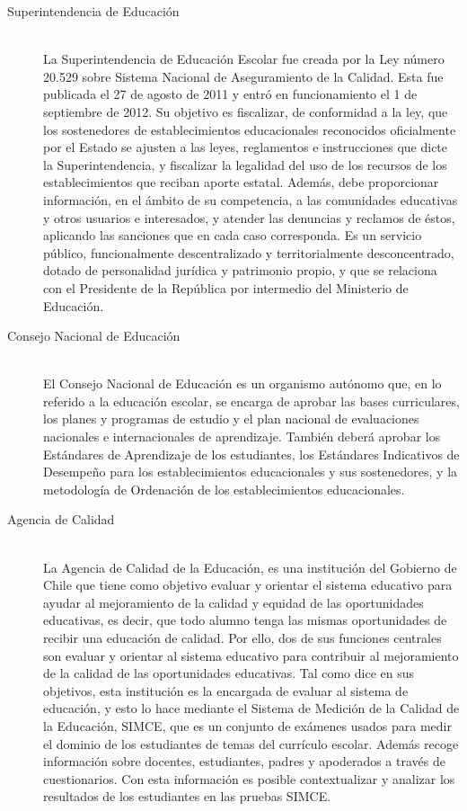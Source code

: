 \begin{description}
\item[Superintendencia de Educación] \hfill \\
La Superintendencia de Educación Escolar fue creada por la Ley número 20.529 sobre Sistema Nacional de Aseguramiento de la Calidad. Esta fue publicada el 27 de agosto de 2011 y entró en funcionamiento el 1 de septiembre de 2012. 
Su objetivo es fiscalizar, de conformidad a la ley, que los sostenedores de establecimientos educacionales reconocidos oficialmente por el Estado se ajusten a las leyes, reglamentos e instrucciones que dicte la Superintendencia, y fiscalizar la legalidad del uso de los recursos de los establecimientos que reciban aporte estatal. Además, debe proporcionar información, en el ámbito de su competencia, a las comunidades educativas y otros usuarios e interesados, y atender las denuncias y reclamos de éstos, aplicando las sanciones que en cada caso corresponda.
Es un servicio público, funcionalmente descentralizado y territorialmente desconcentrado, dotado de personalidad jurídica y patrimonio propio, y que se relaciona con el Presidente de la República por intermedio del Ministerio de Educación. \cite{superint}
\item[Consejo Nacional de Educación] \hfill \\
El Consejo Nacional de Educación es un organismo autónomo que, en lo referido a la educación escolar, se encarga de aprobar las bases curriculares, los planes y programas de estudio y el plan nacional de evaluaciones nacionales e internacionales de aprendizaje. También deberá aprobar los Estándares de Aprendizaje de los estudiantes, los Estándares Indicativos de Desempeño para los establecimientos educacionales y sus sostenedores, y la metodología de Ordenación de los establecimientos educacionales.
\item[Agencia de Calidad] \hfill \\
La Agencia de Calidad de la Educación, es una institución del Gobierno de Chile que tiene como objetivo  evaluar y orientar el sistema educativo para ayudar al mejoramiento de la calidad y equidad de las oportunidades educativas, es decir, que todo alumno tenga las mismas oportunidades de recibir una educación de calidad. Por ello, dos de sus funciones centrales son evaluar y orientar al sistema educativo para contribuir al mejoramiento de la calidad de las oportunidades educativas. \cite{agenciacalidad}
Tal como dice en sus objetivos, esta institución es la encargada de evaluar al sistema de educación, y esto lo hace mediante el Sistema de Medición de la Calidad de la Educación, SIMCE, que es un conjunto de exámenes usados para medir el dominio de los estudiantes de temas del currículo escolar. Además recoge información sobre docentes, estudiantes, padres y apoderados a través de cuestionarios. Con esta información es posible contextualizar y analizar los resultados de los estudiantes en las pruebas SIMCE. 
\end{description}

